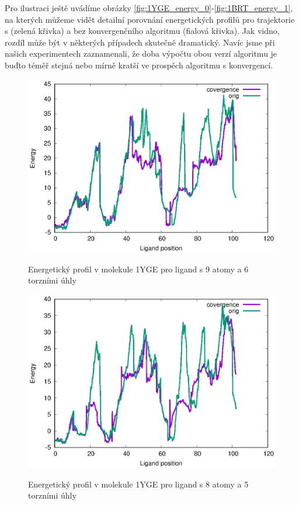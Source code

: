 Pro ilustraci ještě uvádíme obrázky \ref{fig:1YGE_energy_0}-\ref{fig:1BRT_energy_1},
na kterých můžeme vidět detailní porovnání energetických profilů pro trajektorie
s (zelená křivka) a bez konvergenčního algoritmu (fialová křivka). Jak vidno,
rozdíl může být v některých případech skutečně dramatický. Navíc jsme při našich
experimentech zaznamenali, že doba výpočtu obou verzí algoritmu je buďto téměř
stejná nebo mírně kratší ve prospěch algoritmu s konvergencí.

\begin{figure}[ht]
\centering
\begin{minipage}{.49\textwidth}
  \centering
    \includegraphics[width=1\textwidth]{img/1YGE_energy_m008.eps}
    \caption{Energetický profil v molekule 1YGE pro ligand s 9 atomy a 6 torzními úhly}
  \centering
  \label{fig:1YGE_energy_0}
\end{minipage}%
\hfill
\begin{minipage}{.49\textwidth}
     \centering
    \includegraphics[width=1\textwidth]{img/1YGE_energy_m007.eps}
    \caption{Energetický profil v molekule 1YGE pro ligand s 8 atomy a 5 torzními úhly}
  \centering
  \label{fig:1YGE_energy_1}
\end{minipage}
\end{figure}

